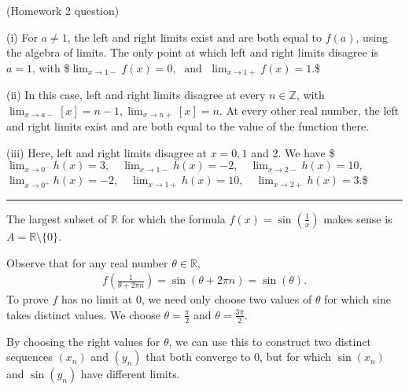 \documentclass[letterpaper,10pt,english]{jupyterBook}
\begin{document}
\sphinxAtStartPar
{\hyperref[\detokenize{Problems:id8}]{}} (Homework 2 question)

\sphinxAtStartPar
(i) For \(a\neq 1\), the left and right limits exist and are both equal to \(f(a)\), using the algebra of limits. The only point at which left and right limits disagree is \(a = 1\), with
\$\(
\lim_{x \rightarrow 1-}f(x) = 0, \; \text{ and } \; \lim_{x \rightarrow 1+}f(x) = 1.
\)\$

\sphinxAtStartPar
(ii) In this case, left and right limits disagree at every \(n \in \mathbb{Z}\), with \(\lim_{x \rightarrow a-}[x] = n-1, \lim_{x \rightarrow n+}[x] = n\). At every other real number, the left and right limits exist and are both equal to the value of the function there.

\sphinxAtStartPar
(iii) Here, left and right limits disagree at \(x = 0, 1\) and \(2\). We have
\$\(
\lim_{x \rightarrow 0^-}h(x) = 3, \hspace{1em} \lim_{x \rightarrow 1-}h(x) = -2, \hspace{1em}  \lim_{x \rightarrow 2-}h(x) = 10,
\)\(
\)\(
\lim_{x \rightarrow 0^+}h(x) = -2, \hspace{1em} \lim_{x \rightarrow 1+}h(x) = 10, \hspace{1em}  \lim_{x \rightarrow 2+}h(x) = 3.
\)\$


\bigskip\hrule\bigskip


\sphinxAtStartPar
{\hyperref[\detokenize{Problems:id9}]{}} The largest subset of \(\mathbb{R}\) for which the formula \(f(x)=\sin\left(\frac{1}{x}\right)\) makes sense is \(A = \mathbb{R} \setminus \{0\}\).

Observe that for any real number \(\theta\in\mathbb{R}\),
\begin{equation*}
\begin{split}
f\left(\frac{1}{\theta+2\pi n}\right) = \sin(\theta+2\pi n) = \sin(\theta).
\end{split}
\end{equation*}
\sphinxAtStartPar
To prove \(f\) has no limit at \(0\), we need only choose two values of \(\theta\) for which sine takes distinct values. We choose \(\theta=\frac{\pi}{2}\) and \(\theta=\frac{3\pi}{2}\).

By choosing the right values for \(\theta\), we can use this to construct two distinct sequences \((x_n)\) and \((y_n)\) that both converge to \(0\), but for which \(\sin(x_n)\) and \(\sin(y_n)\) have different limits.
\end{document}
